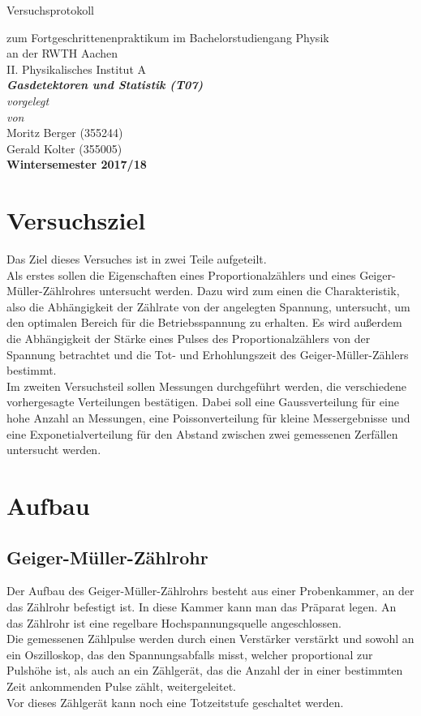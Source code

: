 \documentclass[12pt,a4paper]{article}
\author{Gerald}
\begin{document}
	\setlength{\parindent}{0pt} 
	\begin{center}
		{\LARGE Versuchsprotokoll}\\
		\begin{large}
			zum Fortgeschrittenenpraktikum im Bachelorstudiengang Physik\\[0.4cm]
			an der RWTH Aachen\\
			II. Physikalisches Institut A\\[5.5cm]
			\Large\textbf{\textsl{Gasdetektoren und Statistik (T07)}}\\[5.5cm]
			\normalsize\textit{vorgelegt\\von}\\[0.4cm]
			\large{Moritz Berger (355244)\\Gerald Kolter (355005)}\\[2cm]
			\large \textbf{Wintersemester 2017/18}
		\end{large}
	\end{center}
	\newpage
	
	\tableofcontents
	\newpage
	
	
\section{Versuchsziel}
Das Ziel dieses Versuches ist in zwei Teile aufgeteilt.\\
Als erstes sollen die Eigenschaften eines Proportionalzählers und eines Geiger-Müller-Zählrohres untersucht werden. Dazu wird zum einen die Charakteristik, also die Abhängigkeit der Zählrate von der angelegten Spannung, untersucht, um den optimalen Bereich für die Betriebsspannung zu erhalten. Es wird außerdem die Abhängigkeit der Stärke eines Pulses des Proportionalzählers von der Spannung betrachtet und die Tot- und  Erhohlungszeit des Geiger-Müller-Zählers bestimmt.\\
Im zweiten Versuchsteil sollen Messungen durchgeführt werden, die verschiedene vorhergesagte Verteilungen bestätigen. Dabei soll eine Gaussverteilung für eine hohe Anzahl an Messungen, eine Poissonverteilung für kleine Messergebnisse und eine Exponetialverteilung für den Abstand zwischen zwei gemessenen Zerfällen untersucht werden. 
\section{Aufbau}
\subsection{Geiger-Müller-Zählrohr}
Der Aufbau des Geiger-Müller-Zählrohrs besteht aus einer Probenkammer, an der das Zählrohr befestigt ist. In diese Kammer kann man das Präparat legen. An das Zählrohr ist eine regelbare Hochspannungsquelle angeschlossen.\\
Die gemessenen Zählpulse werden durch einen Verstärker verstärkt und sowohl an ein Oszilloskop, das den Spannungsabfalls misst, welcher proportional zur Pulshöhe ist, als auch an ein Zählgerät, das die Anzahl der in einer bestimmten Zeit ankommenden Pulse zählt, weitergeleitet.\\
Vor dieses Zählgerät kann noch eine Totzeitstufe geschaltet werden.
\end{document}
